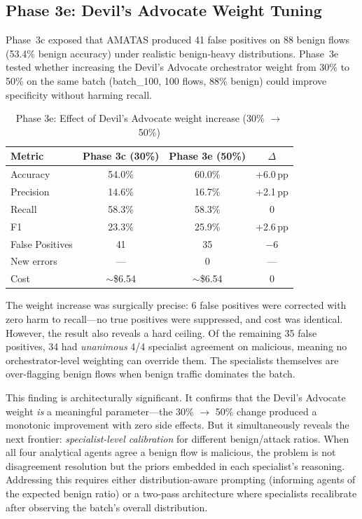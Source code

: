 \documentclass[12pt, a4paper, oneside]{report}
\begin{document}
\subsection{Phase 3e: Devil's Advocate Weight Tuning}
\label{sec:phase3e}

Phase~3c exposed that AMATAS produced 41 false positives on 88 benign flows
(53.4\% benign accuracy) under realistic benign-heavy distributions. Phase~3e
tested whether increasing the Devil's Advocate orchestrator weight from 30\% to
50\% on the same batch (batch\_100, 100 flows, 88\% benign) could improve
specificity without harming recall.

\begin{table}[H]
\centering
\caption{Phase 3e: Effect of Devil's Advocate weight increase (30\% $\to$ 50\%)}
\label{tab:phase3e}
\begin{tabular}{@{}lccc@{}}
\toprule
\textbf{Metric} & \textbf{Phase 3c (30\%)} & \textbf{Phase 3e (50\%)}
  & \textbf{$\Delta$} \\
\midrule
Accuracy         & 54.0\%  & 60.0\%  & +6.0\,pp \\
Precision        & 14.6\%  & 16.7\%  & +2.1\,pp \\
Recall           & 58.3\%  & 58.3\%  & 0 \\
F1               & 23.3\%  & 25.9\%  & +2.6\,pp \\
False Positives  & 41      & 35      & $-$6 \\
New errors       & ---     & 0       & --- \\
Cost             & $\sim$\$6.54 & $\sim$\$6.54 & 0 \\
\bottomrule
\end{tabular}
\end{table}

The weight increase was surgically precise: 6 false positives were corrected with
zero harm to recall---no true positives were suppressed, and cost was identical.
However, the result also reveals a hard ceiling. Of the remaining 35 false
positives, 34 had \emph{unanimous} 4/4 specialist agreement on malicious,
meaning no orchestrator-level weighting can override them. The specialists
themselves are over-flagging benign flows when benign traffic dominates the batch.

This finding is architecturally significant. It confirms that the Devil's Advocate
weight \emph{is} a meaningful parameter---the 30\% $\to$ 50\% change produced a
monotonic improvement with zero side effects. But it simultaneously reveals the
next frontier: \emph{specialist-level calibration} for different benign/attack
ratios. When all four analytical agents agree a benign flow is malicious, the
problem is not disagreement resolution but the priors embedded in each specialist's
reasoning. Addressing this requires either distribution-aware prompting (informing
agents of the expected benign ratio) or a two-pass architecture where specialists
recalibrate after observing the batch's overall distribution.
\end{document}
